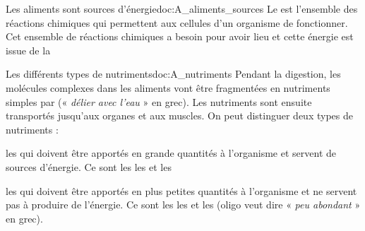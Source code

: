 \tetePremStssBiom
{}

\begin{doc}{Les aliments sont sources d'énergie}{doc:A_aliments_sources}
  Le  est l'ensemble des réactions chimiques qui permettent aux cellules d'un organisme de fonctionner.
  Cet ensemble de réactions chimiques a besoin  pour avoir lieu et cette énergie est issue de la 
\end{doc}

\begin{doc}{Les différents types de nutriments}{doc:A_nutriments}
  Pendant la digestion, les molécules complexes dans les aliments vont être fragmentées en nutriments simples par  (« \textit{délier avec l'eau} » en grec).
  Les nutriments sont ensuite transportés jusqu'aux organes et aux muscles.
  On peut distinguer deux types de nutriments :
  \begin{listePoints}
    \item les  qui doivent être apportés en grande quantités à l'organisme et servent de sources d'énergie. Ce sont les  les  et les 
    \item les  qui doivent être apportés en plus petites quantités à l'organisme et ne servent pas à produire de l'énergie.
    Ce sont les  les  et les  (oligo veut dire « \textit{peu abondant} » en grec).
  \end{listePoints}
\end{doc}


